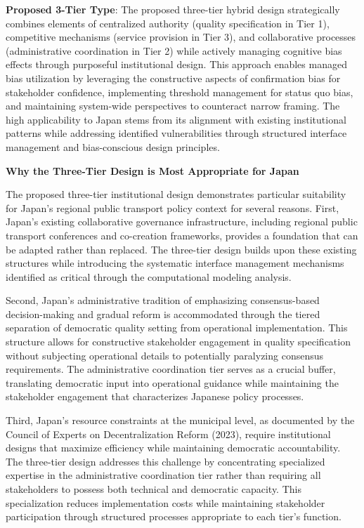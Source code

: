\textbf{Proposed 3-Tier Type}: The proposed three-tier hybrid design
strategically combines elements of centralized authority (quality
specification in Tier 1), competitive mechanisms (service provision in
Tier 3), and collaborative processes (administrative coordination in
Tier 2) while actively managing cognitive bias effects through
purposeful institutional design. This approach enables managed bias
utilization by leveraging the constructive aspects of confirmation bias
for stakeholder confidence, implementing threshold management for status
quo bias, and maintaining system-wide perspectives to counteract narrow
framing. The high applicability to Japan stems from its alignment with
existing institutional patterns while addressing identified
vulnerabilities through structured interface management and
bias-conscious design principles.

\textbf{Why the Three-Tier Design is Most Appropriate for Japan}

The proposed three-tier institutional design demonstrates particular
suitability for Japan's regional public transport policy context for
several reasons. First, Japan's existing collaborative governance
infrastructure, including regional public transport conferences and
co-creation frameworks, provides a foundation that can be adapted rather
than replaced. The three-tier design builds upon these existing
structures while introducing the systematic interface management
mechanisms identified as critical through the computational modeling
analysis.

Second, Japan's administrative tradition of emphasizing consensus-based
decision-making and gradual reform is accommodated through the tiered
separation of democratic quality setting from operational
implementation. This structure allows for constructive stakeholder
engagement in quality specification without subjecting operational
details to potentially paralyzing consensus requirements. The
administrative coordination tier serves as a crucial buffer, translating
democratic input into operational guidance while maintaining the
stakeholder engagement that characterizes Japanese policy processes.

Third, Japan's resource constraints at the municipal level, as
documented by the Council of Experts on Decentralization Reform (2023),
require institutional designs that maximize efficiency while maintaining
democratic accountability. The three-tier design addresses this
challenge by concentrating specialized expertise in the administrative
coordination tier rather than requiring all stakeholders to possess both
technical and democratic capacity. This specialization reduces
implementation costs while maintaining stakeholder participation through
structured processes appropriate to each tier's function.

